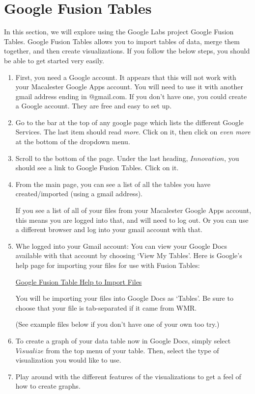 \documentclass[letterpaper,10pt,openany,oneside]{sphinxmanual}
\begin{document}
\section{Google Fusion Tables}
\label{WmrActivities/WmrActivities:google-fusion-tables}
In this section, we will explore using the Google Labs project
Google Fusion Tables. Google Fusion Tables allows you to import
tables of data, merge them together, and then create
visualizations. If you follow the below steps, you should be able
to get started very easily.
\begin{enumerate}
\item {} 
First, you need a Google account. It appears that this will not
work with your Macalester Google Apps account. You will need to use
it with another gmail address ending in @gmail.com. If you don't
have one, you could create a Google account. They are free and easy
to set up.

\item {} 
Go to the bar at the top of any google page which lists the
different Google Services. The last item should read \emph{more}. Click
on it, then click on \emph{even more} at the bottom of the dropdown
menu.

\item {} 
Scroll to the bottom of the page. Under the last heading,
$Innovation$, you should see a link to Google Fusion
Tables. Click on it.

\item {} 
From the main page, you can see a list of all the tables you
have created/imported (using a gmail address).

If you see a list of all of your files from your Macalester Google
Apps account, this means you are logged into that, and will need to
log out. Or you can use a different browser and log into your gmail
account with that.

\item {} 
Whe logged into your Gmail account: You can view your Google
Docs available with that account by choosing `View My Tables'. Here
is Google's help page for importing your files for use with Fusion
Tables:

\href{http://www.google.com/support/fusiontables/bin/answer.py?hl=en\&answer=181717}{Google Fusion Table Help to Import Files}

You will be importing your files into Google Docs as `Tables'. Be
sure to choose that your file is tab-separated if it came from
WMR.

(See example files below if you don't have one of your own too
try.)

\item {} 
To create a graph of your data table now in Google Docs, simply
select $Visualize$ from the top menu of your table. Then,
select the type of visualization you would like to use.

\item {} 
Play around with the different features of the visualizations to
get a feel of how to create graphs.

\end{enumerate}
\end{document}
